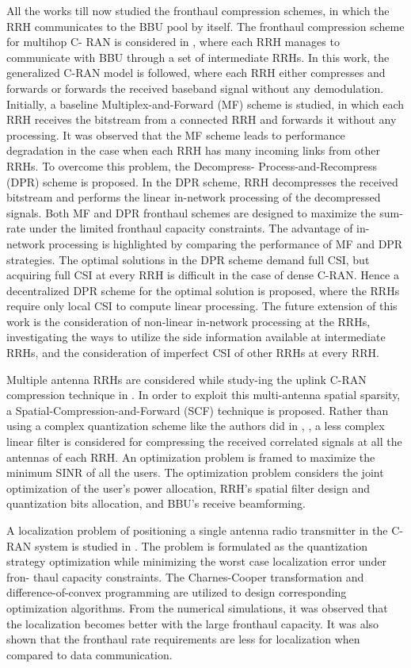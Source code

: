 \begin{multicols}{2}
\begin{itemize}
All the works till now studied the fronthaul compression schemes, in which the RRH communicates to the BBU pool by itself. The fronthaul compression scheme for multihop C- RAN is considered in \cite{art3-key56}, where each RRH manages to communicate with BBU through a set of intermediate RRHs. In this work, the generalized C-RAN model is followed, where each RRH either compresses and forwards or forwards the received baseband signal without any demodulation. Initially, a baseline Multiplex-and-Forward (MF) scheme is studied, in which each RRH receives the bitstream from a connected RRH and forwards it without any processing. It was observed that the MF scheme leads to performance degradation in the case when each RRH has many incoming links from other RRHs. To overcome this problem, the Decompress- Process-and-Recompress (DPR) scheme is proposed. In the DPR scheme, RRH decompresses the received bitstream and performs the linear in-network processing of the decompressed signals. Both MF and DPR fronthaul schemes are designed to maximize the sum-rate under the limited fronthaul capacity constraints. The advantage of in-network processing is highlighted by comparing the performance of MF and DPR strategies. The optimal solutions in the DPR scheme demand full CSI, but acquiring full CSI at every RRH is difficult in the case of dense C-RAN. Hence a decentralized DPR scheme for the optimal solution is proposed, where the RRHs require only local CSI to compute linear processing. The future extension of this work is the consideration of non-linear in-network processing at the RRHs, investigating the ways to utilize the side information available at intermediate RRHs, and the consideration of imperfect CSI of other RRHs at every RRH.

Multiple antenna RRHs are considered while study-ing the uplink C-RAN compression technique in \cite{art3-key57}. In order to exploit this multi-antenna spatial sparsity, a Spatial-Compression-and-Forward (SCF) technique is proposed. Rather than using a complex quantization scheme like the authors did in \cite{art3-key51}, \cite{art3-key53}, a less complex linear filter is considered for compressing the received correlated signals at all the antennas of each RRH. An optimization problem is framed to maximize the minimum SINR of all the users. The optimization problem considers the joint optimization of the user’s power allocation, RRH’s spatial filter design and quantization bits allocation, and BBU’s receive beamforming.

A localization problem of positioning a single antenna radio transmitter in the C-RAN system is studied in \cite{art3-key58}. The problem is formulated as the quantization strategy optimization while minimizing the worst case localization error under fron- thaul capacity constraints. The Charnes-Cooper transformation and difference-of-convex programming are utilized to design corresponding optimization algorithms. From the numerical simulations, it was observed that the localization becomes better with the large fronthaul capacity. It was also shown that the fronthaul rate requirements are less for localization when compared to data communication.


\end{itemize}
\end{multicols}
